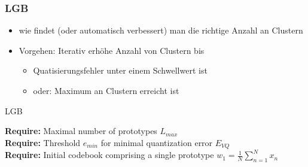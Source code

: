 	\subsubsection{LGB}
	\begin{itemize}
		\item wie findet (oder automatisch verbessert) man die richtige Anzahl an Clustern
		\item Vorgehen: Iterativ erhöhe Anzahl von Clustern bis 
		\begin{itemize}
			\item Quatisierungsfehler unter einem Schwellwert ist
			\item oder: Maximum an Clustern erreicht ist
		\end{itemize}
	\end{itemize}
	\begin{algorithm}
	\caption{LGB}\label{euclid}
	\begin{flushleft}
		\textbf{Require:} Maximal number of prototypes $L_{max}$\\
		\textbf{Require:} Threshold $e_{min}$ for minimal quantization error $E_{VQ}$\\
		\textbf{Require:} Initial codebook comprising a single prototype $w_1 = \frac{1}{N}\sum_{n=1}^Nx_n$
	\end{flushleft}
	\begin{algorithmic}[1]
		\Repeat
		\EndFor
	\end{algorithmic}
	\end{algorithm}
\newpage
